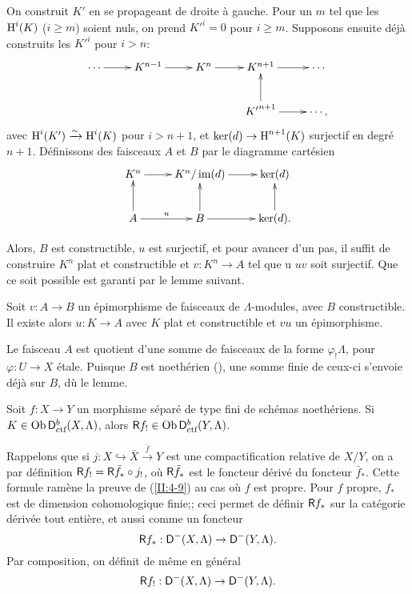 \documentclass[oneside]{book}
\begin{document}
On construit $K'$ en se propageant de droite \`a gauche. Pour un $m$ tel que les 
$\operatorname{H}^i(K)$ ($i\geqslant m$) soient nuls, on prend ${K'}^i = 0$ pour 
$i\geqslant m$. Supposons ensuite d\'ej\`a construits les ${K'}^i$ pour 
$i>n$:
\[\xymatrix{
  \cdots \ar[r] 
    & K^{n-1} \ar[r] 
    & K^n \ar[r] 
    & K^{n+1} \ar[r] 
    & \cdots \\
  & & & {K'}^{n+1} \ar[u] \ar[r] 
    & \cdots \text{,}
}\]
avec $\operatorname{H}^i(K')\xrightarrow\sim \operatorname{H}^i(K)$ pour $i>n+1$, et $\ker(d)\to\operatorname{H}^{n+1}(K)$ surjectif 
en degr\'e $n+1$. D\'efinissons des faisceaux $A$ et $B$ par le diagramme 
cart\'esien 
\[\xymatrix{
  K^n \ar[r] 
    & K^n/\im(d) \ar[r] 
    & \ker(d) \\
  A \ar[u] \ar[r]^u 
    & B \ar[u]\ar[r] 
    & \ker(d) \ar[u] \text{.}
}\]

Alors, $B$ est constructible, $u$ est surjectif, et pour avancer d'un pas, il 
suffit de construire $K^n$ plat et constructible et $v:K^n\to A$ tel que u
$u v$ soit surjectif. Que ce soit possible est garanti par le lemme suivant. 





\begin{lemma_}\label{II:4-8}
Soit $v:A\to B$ un \'epimorphisme de faisceaux de $\Lambda$-modules, avec $B$ 
constructible. Il existe alors $u:K\to A$ avec $K$ plat et constructible et 
$v u$ un \'epimorphisme. 
\end{lemma_}

Le faisceau $A$ est quotient d'une somme de faisceaux de la forme 
$\varphi_! \Lambda$, pour $\varphi:U\to X$ \'etale. Puisque $B$ est noeth\'erien 
(\cite[IX.2.10]{4}), une somme finie de ceux-ci s'envoie d\'ej\`a sur $B$, 
d\`u le lemme. 





\begin{theorem_}\label{II:4-9}
Soit $f:X\to Y$ un morphisme s\'epar\'e de type fini de sch\'emas noeth\'eriens. 
Si $K\in\operatorname{Ob}\mathsf{D}_\textnormal{ctf}^b(X,\Lambda)$, alors 
$\mathsf{R} f_!\in \operatorname{Ob}\mathsf{D}_\textnormal{ctf}^b(Y,\Lambda)$. 
\end{theorem_}

Rappelons que si $j:X\hookrightarrow \bar X \xrightarrow{\bar f} Y$ est une 
compactification relative de $X/Y$, on a par d\'efinition 
$\mathsf{R} f_! = \mathsf{R} \bar f_* \circ j_!$, o\`u $\mathsf{R} \bar f_*$ est le foncteur d\'eriv\'e 
du foncteur $\bar f_*$. Cette formule ram\`ene la preuve de (\ref{II:4-9}) 
au cas o\`u $f$ est propre. Pour $f$ propre, $f_*$ est de dimension 
cohomologique finie;; ceci permet de d\'efinir $\mathsf{R} f_*$ sur la cat\'egorie 
d\'eriv\'ee tout enti\`ere, et aussi comme un foncteur 
\[
  \mathsf{R} f_* : \mathsf{D}^-(X,\Lambda) \to \mathsf{D}^-(Y,\Lambda) \text{.}
\]
Par composition, on d\'efinit de m\^eme en g\'en\'eral 
\[
  \mathsf{R} f_! : \mathsf{D}^-(X,\Lambda) \to \mathsf{D}^-(Y,\Lambda) \text{.}
\]
\end{document}
